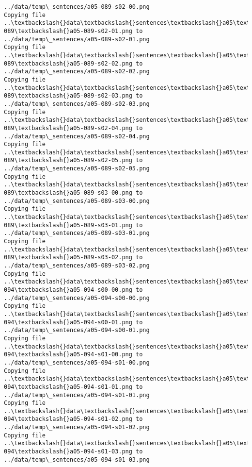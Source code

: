 \documentclass[11pt]{article}
\begin{document}
\begin{Verbatim}[commandchars=\\\{\}]
../data/temp\_sentences/a05-089-s02-00.png
Copying file ..\textbackslash{}data\textbackslash{}sentences\textbackslash{}a05\textbackslash{}a05-089\textbackslash{}a05-089-s02-01.png to
../data/temp\_sentences/a05-089-s02-01.png
Copying file ..\textbackslash{}data\textbackslash{}sentences\textbackslash{}a05\textbackslash{}a05-089\textbackslash{}a05-089-s02-02.png to
../data/temp\_sentences/a05-089-s02-02.png
Copying file ..\textbackslash{}data\textbackslash{}sentences\textbackslash{}a05\textbackslash{}a05-089\textbackslash{}a05-089-s02-03.png to
../data/temp\_sentences/a05-089-s02-03.png
Copying file ..\textbackslash{}data\textbackslash{}sentences\textbackslash{}a05\textbackslash{}a05-089\textbackslash{}a05-089-s02-04.png to
../data/temp\_sentences/a05-089-s02-04.png
Copying file ..\textbackslash{}data\textbackslash{}sentences\textbackslash{}a05\textbackslash{}a05-089\textbackslash{}a05-089-s02-05.png to
../data/temp\_sentences/a05-089-s02-05.png
Copying file ..\textbackslash{}data\textbackslash{}sentences\textbackslash{}a05\textbackslash{}a05-089\textbackslash{}a05-089-s03-00.png to
../data/temp\_sentences/a05-089-s03-00.png
Copying file ..\textbackslash{}data\textbackslash{}sentences\textbackslash{}a05\textbackslash{}a05-089\textbackslash{}a05-089-s03-01.png to
../data/temp\_sentences/a05-089-s03-01.png
Copying file ..\textbackslash{}data\textbackslash{}sentences\textbackslash{}a05\textbackslash{}a05-089\textbackslash{}a05-089-s03-02.png to
../data/temp\_sentences/a05-089-s03-02.png
Copying file ..\textbackslash{}data\textbackslash{}sentences\textbackslash{}a05\textbackslash{}a05-094\textbackslash{}a05-094-s00-00.png to
../data/temp\_sentences/a05-094-s00-00.png
Copying file ..\textbackslash{}data\textbackslash{}sentences\textbackslash{}a05\textbackslash{}a05-094\textbackslash{}a05-094-s00-01.png to
../data/temp\_sentences/a05-094-s00-01.png
Copying file ..\textbackslash{}data\textbackslash{}sentences\textbackslash{}a05\textbackslash{}a05-094\textbackslash{}a05-094-s01-00.png to
../data/temp\_sentences/a05-094-s01-00.png
Copying file ..\textbackslash{}data\textbackslash{}sentences\textbackslash{}a05\textbackslash{}a05-094\textbackslash{}a05-094-s01-01.png to
../data/temp\_sentences/a05-094-s01-01.png
Copying file ..\textbackslash{}data\textbackslash{}sentences\textbackslash{}a05\textbackslash{}a05-094\textbackslash{}a05-094-s01-02.png to
../data/temp\_sentences/a05-094-s01-02.png
Copying file ..\textbackslash{}data\textbackslash{}sentences\textbackslash{}a05\textbackslash{}a05-094\textbackslash{}a05-094-s01-03.png to
../data/temp\_sentences/a05-094-s01-03.png

\end{Verbatim}
\end{document}
